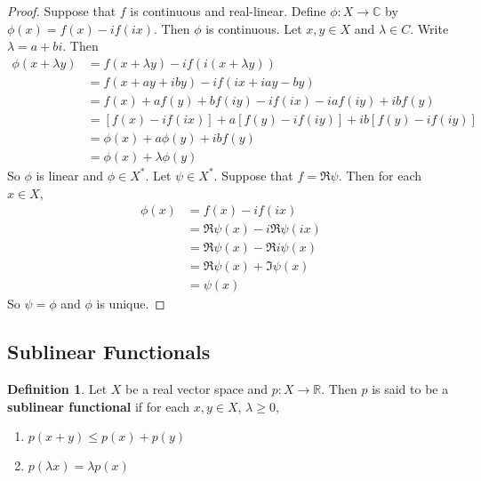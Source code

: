 \documentclass[12pt]{amsart}
\theoremstyle{definition}
\newtheorem{defn}[definition]{Definition}
\newcommand{\lam}{\lambda}
\newcommand{\C}{\mathbb{C}}
\newcommand{\R}{\mathbb{R}}
\newcommand{\ld}[1]{\label{defn:#1}}
\begin{document}
	\begin{proof}
		Suppose that $f$ is continuous and real-linear. Define $\phi:X \rightarrow \C$ by $\phi(x) = f(x) -if(ix)$. Then $\phi$ is continuous. Let $x,y \in X$ and $\lam \in C$. Write $\lam = a + bi$. Then 
		\begin{align*}
			\phi(x + \lam y)
			&= f(x + \lam y) -if(i(x + \lam y)) \\
			&= f(x + ay + i by) -if(ix + iay - by) \\
			&= f(x) + af(y) + bf(iy) - if(ix) - iaf(iy) +ibf(y) \\
			&= [f(x) - if(ix)] + a[f(y) - if(iy)] + ib[f(y) -if(iy)] \\
			&= \phi(x) + a\phi(y) +ibf(y) \\
			&= \phi(x) + \lam \phi(y) 
		\end{align*}
	So $\phi$ is linear and $\phi \in X^*$. Let $\psi \in X^*$. Suppose that $f = \Re \psi$. 
	Then for each $x \in X$,
	\begin{align*}
		\phi(x) 
		&= f(x) - if(ix) \\
		&= \Re \psi(x) -i \Re \psi(ix) \\
		&= \Re \psi(x) - \Re i\psi(x) \\
		&= \Re \psi(x) + \Im \psi(x) \\
		&= \psi(x)
	\end{align*} 
	So $\psi = \phi$ and $\phi$ is unique.
	\end{proof}


	





















	
	\newpage	
	\subsection{Sublinear Functionals}
	
	\begin{defn} \ld{55003}
		Let $X$ be a real vector space and $p:X \rightarrow \R$. Then $p$ is said to be a \textbf{sublinear functional} if for each $x,y \in X$, $\lam \geq 0$, 
		\begin{enumerate}
			\item $p(x+y) \leq p(x) + p(y)$
			\item $p(\lam x ) = \lam p(x)$
		\end{enumerate}  
	\end{defn}
	
\end{document}

